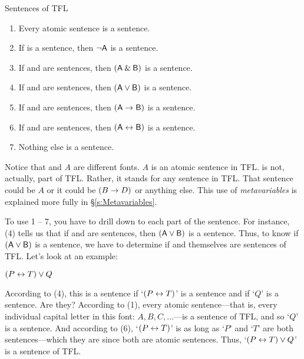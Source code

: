 \begin{factboxy}{Sentences of TFL}\label{TFLsentences}
	\begin{enumerate}
		\item Every atomic sentence is a sentence.
		\item If  is a sentence, then ${\neg}\mathsf{A}$ is a sentence.
		\item If  and  are sentences, then $(\mathsf{A}\mathbin{\&}\mathsf{B})$ is a sentence.
		\item If  and  are sentences, then $(\mathsf{A}\vee\mathsf{B})$ is a sentence.
		\item If  and  are sentences, then $(\mathsf{A}\rightarrow\mathsf{B})$ is a sentence.
		\item If  and  are sentences, then $(\mathsf{A}\leftrightarrow\mathsf{B})$ is a sentence.
		\item Nothing else is a sentence.
	\end{enumerate}
\tcblower
\footnotesize{Notice that  and $A$ are different fonts. $A$ is an atomic sentence in TFL.  is not, actually, part of TFL. Rather, it stands for any sentence in TFL. That sentence could be $A$ or it could be $(B \rightarrow D)$ or anything else. This use of \textit{metavariables} is explained more fully in \S\ref{s:Metavariables}.}
\end{factboxy}

To use 1 -- 7, you have to drill down to each part of the sentence. For instance, (4) tells us that if  and  are sentences, then $(\mathsf{A}\vee\mathsf{B})$ is a sentence. Thus, to know if $(\mathsf{A}\vee\mathsf{B})$ is a sentence, we have to determine if  and  themselves are sentences of TFL. Let's look at an example:

\begin{earg}
\item[] $(P \leftrightarrow T) \vee Q$
\end{earg}

\noindent According to (4), this is a sentence if `$(P \leftrightarrow T)$' is a sentence and if `$Q$' is a sentence. Are they? According to (1), every atomic sentence---that is, every individual capital letter in this font: $A, B, C, \ldots$---is a sentence of TFL, and so `$Q$' is a sentence. And according to (6), `$(P \leftrightarrow T)$' is as long as `$P$' and `$T$' are both sentences---which they are since both are atomic sentences. Thus, `$(P \leftrightarrow T) \vee Q$' is a sentence of TFL. 


